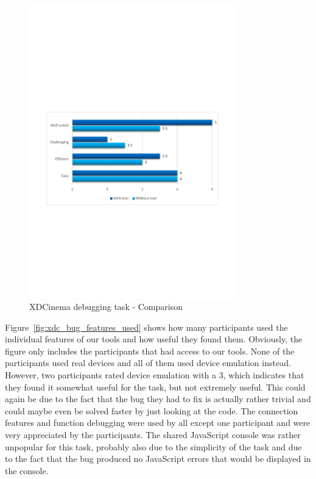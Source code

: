 \begin{figure}[H]
  \centering
    \includegraphics[width=0.8\textwidth]{images/charts/xdc_bug_comparison.pdf}
	\caption[xdc-bug: Comparison]{XDCinema debugging task - Comparison}
	\label{fig:xdc_bug_comparison}
\end{figure}

Figure~\ref{fig:xdc_bug_features_used} shows how many participants used the individual features of our tools and how useful they found them. Obviously, the figure only includes the participants that had access to our tools. None of the participants used real devices and all of them used device emulation instead. However, two participants rated device emulation with a 3, which indicates that they found it somewhat useful for the task, but not extremely useful. This could again be due to the fact that the bug they had to fix is actually rather trivial and could maybe even be solved faster by just looking at the code. The connection features and function debugging were used by all except one participant and were very appreciated by the participants. The shared JavaScript console was rather unpopular for this task, probably also due to the simplicity of the task and due to the fact that the bug produced no JavaScript errors that would be displayed in the console.

